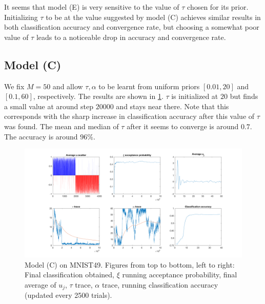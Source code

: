 \documentclass{siamart1116}
\begin{document}
            It seems that model (E) is very sensitive to the value of $\tau$ chosen for its prior. Initializing $\tau$ to be at the value suggested by model (C) achieves similar results in both classification accuracy and convergence rate, but choosing a somewhat poor value of $\tau$ leads to a noticeable drop in accuracy and convergence rate.
    \fi
    \subsection{Model (C)}
        We fix $M=50$ and allow $\tau, \alpha$ to be learnt from uniform priors $[0.01, 20]$ and $[0.1, 60]$, respectively. The results are shown in \cref{fig:model_c_mnist}. $\tau$ is initialized at $20$ but finds a small value at around step $20000$ and stays near there. Note that this corresponds with the sharp increase in classification accuracy after this value of $\tau$ was found. The mean and median of $\tau$ after it seems to converge is around $0.7$. The accuracy is around $96\%$.
        \begin{figure}[!htb]
            \centering
            \caption{\label{fig:model_c_mnist}Model (C) on MNIST49. Figures from top to bottom, left to right: Final classification obtained, $\xi$ running acceptance probability, final average of $u_j$, $\tau$ trace, $\alpha$ trace, running classification accuracy (updated every 2500 trials).}
            \includegraphics[width=0.8\linewidth]{model_c_vs_model_e/mnist/learn_t_a/all.png}
        \end{figure}
\end{document}
